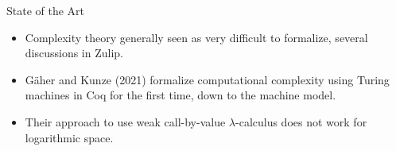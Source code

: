 \documentclass{beamer}
\begin{document}
\begin{frame}{State of the Art}
  \begin{itemize}
    \item Complexity theory generally seen as very difficult to formalize, several discussions in Zulip.
    \item Gäher and Kunze (2021) formalize computational complexity using Turing machines in Coq for the first time, down to the machine model.
    \item Their approach to use weak call-by-value $\lambda$-calculus does not work for logarithmic space.
  \end{itemize}
\end{frame}

\end{document}
